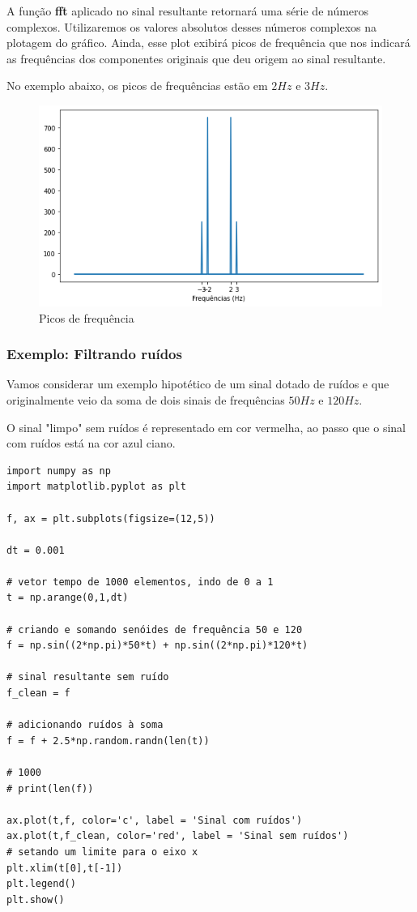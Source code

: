 A função \textbf{fft} aplicado no sinal resultante retornará uma série de números complexos. Utilizaremos os valores absolutos desses números complexos na plotagem do gráfico. Ainda, esse plot exibirá picos de frequência que nos indicará as frequências dos componentes originais que deu origem ao sinal resultante. 

No exemplo abaixo, os picos de frequências estão em $2Hz$ e $3Hz$.

\begin{figure}[H]
	\centering
	\includegraphics[width=1\textwidth]{./Imagens/Transformada de Fourier/TF2.png} 
	\caption{Picos de frequência}
	\label{fig:TF2}
\end{figure}

\subsubsection{Exemplo: Filtrando ruídos}
Vamos considerar um exemplo hipotético de um sinal dotado de ruídos e que originalmente veio da soma de dois sinais de frequências $50Hz$ e $120Hz$.

O sinal "limpo" sem ruídos é representado em cor vermelha, ao passo que o sinal com ruídos está na cor azul ciano.

\begin{verbatim}
import numpy as np
import matplotlib.pyplot as plt

f, ax = plt.subplots(figsize=(12,5))

dt = 0.001

# vetor tempo de 1000 elementos, indo de 0 a 1
t = np.arange(0,1,dt)

# criando e somando senóides de frequência 50 e 120
f = np.sin((2*np.pi)*50*t) + np.sin((2*np.pi)*120*t)

# sinal resultante sem ruído
f_clean = f

# adicionando ruídos à soma
f = f + 2.5*np.random.randn(len(t))

# 1000
# print(len(f))

ax.plot(t,f, color='c', label = 'Sinal com ruídos')
ax.plot(t,f_clean, color='red', label = 'Sinal sem ruídos')
# setando um limite para o eixo x
plt.xlim(t[0],t[-1])
plt.legend()
plt.show()
\end{verbatim}

